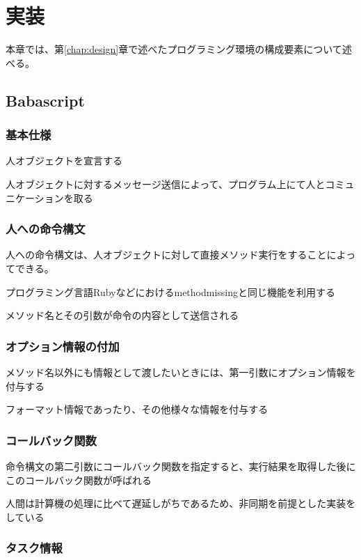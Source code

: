 \chapter{実装}
\label{chap:implementation}

本章では、第\ref{chap:design}章で述べたプログラミング環境の構成要素について述べる。

\section{Babascript}

\subsection{基本仕様}
人オブジェクトを宣言する

人オブジェクトに対するメッセージ送信によって、プログラム上にて人とコミュニケーションを取る

\subsection{人への命令構文}
人への命令構文は、人オブジェクトに対して直接メソッド実行をすることによってできる。

プログラミング言語Rubyなどにおけるmethodmissingと同じ機能を利用する

メソッド名とその引数が命令の内容として送信される

\subsection{オプション情報の付加}

メソッド名以外にも情報として渡したいときには、第一引数にオプション情報を付与する

フォーマット情報であったり、その他様々な情報を付与する

\subsection{コールバック関数}

命令構文の第二引数にコールバック関数を指定すると、実行結果を取得した後にこのコールバック関数が呼ばれる

人間は計算機の処理に比べて遅延しがちであるため、非同期を前提とした実装をしている

\subsection{タスク情報}

